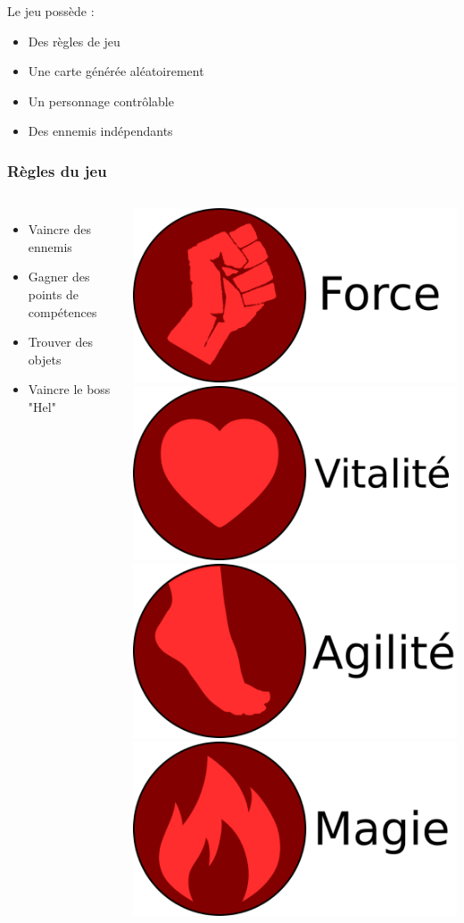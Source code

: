 \documentclass{beamer}
\begin{document}
\begin{frame}
Le jeu possède :
\begin{itemize}
	\item Des règles de jeu
	\item Une carte générée aléatoirement
	\item Un personnage contrôlable
	\item Des ennemis indépendants
\end{itemize}
\end{frame}

\begin{frame}
\frametitle{Règles du jeu}
\begin{columns}
\begin{itemize}
	\item Vaincre des ennemis
	\item Gagner des points de compétences
	\item Trouver des objets
	\item Vaincre le boss "Hel"
\end{itemize}
\begin{center}
\includegraphics[width=.45\textwidth]{img/pres_strenght.png}\\
\includegraphics[width=.45\textwidth]{img/pres_vitality.png}\\
\includegraphics[width=.45\textwidth]{img/pres_agility.png}\\
\includegraphics[width=.45\textwidth]{img/pres_magic.png}
\end{center}
\end{columns}
\end{frame}
\end{document}
